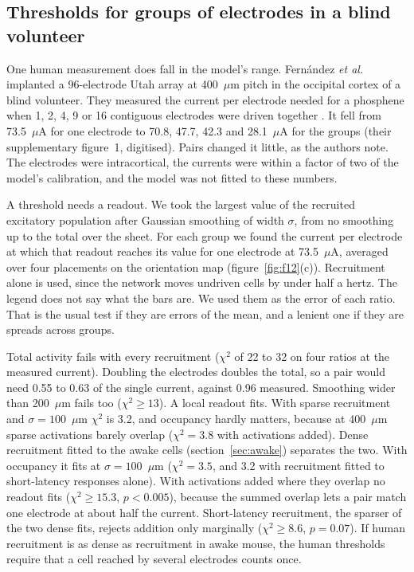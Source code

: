 \documentclass[10pt,twocolumn]{article}
\newcommand{\um}{\ensuremath{\mu\text{m}}}
\newcommand{\uA}{\ensuremath{\mu\text{A}}}
\begin{document}
\subsection{Thresholds for groups of electrodes in a blind volunteer}
\label{sec:fernandez}

One human measurement does fall in the model's range. Fern\'andez
\textit{et al.} implanted a 96-electrode Utah array at 400~\um{} pitch in
the occipital cortex of a blind volunteer. They measured the current per
electrode needed for a phosphene when 1, 2, 4, 9 or 16 contiguous
electrodes were driven together \citep{fernandez2021}. It fell from
73.5~\uA{} for one electrode to 70.8, 47.7, 42.3 and 28.1~\uA{} for the
groups (their supplementary figure~1, digitised). Pairs changed it little,
as the authors note. The electrodes were intracortical, the currents were
within a factor of two of the model's calibration, and the model was not
fitted to these numbers.

A threshold needs a readout. We took the largest value of the recruited
excitatory population after Gaussian smoothing of width $\sigma$, from no
smoothing up to the total over the sheet. For each group we found the
current per electrode at which that readout reaches its value for one
electrode at 73.5~\uA, averaged over four placements on the orientation
map (figure~\ref{fig:f12}(c)). Recruitment alone is used, since the
network moves undriven cells by under half a hertz. The legend does not
say what the bars are. We used them as the error of each ratio. That is
the usual test if they are errors of the mean, and a lenient one if they
are spreads across groups.

Total activity fails with every recruitment ($\chi^2$ of 22 to 32 on four
ratios at the measured current). Doubling the electrodes doubles the
total, so a pair would need 0.55 to 0.63 of the single current, against
0.96 measured. Smoothing wider than 200~\um{} fails too ($\chi^2\ge13$).
A local readout fits. With sparse recruitment and $\sigma=100$~\um{} $\chi^2$ is
3.2, and occupancy hardly matters, because at 400~\um{} sparse activations
barely overlap ($\chi^2=3.8$ with activations added). Dense recruitment
fitted to the awake cells (section~\ref{sec:awake}) separates the two.
With occupancy it fits at $\sigma=100$~\um{} ($\chi^2=3.5$, and 3.2 with
recruitment fitted to short-latency responses alone). With activations
added where they overlap no readout fits ($\chi^2\ge15.3$, $p<0.005$),
because the summed overlap lets a pair match one electrode at about half
the current. Short-latency recruitment, the sparser of the two dense fits,
rejects addition only marginally ($\chi^2\ge8.6$, $p=0.07$). If human recruitment is as dense as recruitment in awake
mouse, the human thresholds require that a cell reached by several
electrodes counts once.
\end{document}
